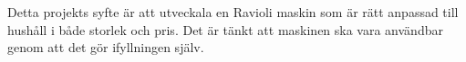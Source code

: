 Detta projekts syfte är att utveckala en Ravioli maskin som är rätt anpassad till hushåll i både storlek och pris. Det är tänkt att maskinen ska vara användbar genom att det gör ifyllningen själv. 

